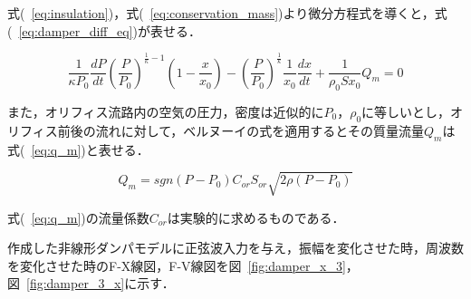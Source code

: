 \documentclass[a4paper,12pt]{article_vdlab_sotsuron}
\begin{document}
式(~\ref{eq:insulation})，式(~\ref{eq:conservation_mass})より微分方程式を導くと，式(~\ref{eq:damper_diff_eq})が表せる．

\begin{equation}
  \frac{1}{\kappa P_0} \frac{dP}{dt} \left(\frac{P}{P_0} \right)^{\frac{1}{\kappa} -1} \left(1 - \frac{x}{x_0} \right) - \left(\frac{P}{P_0} \right)^{\frac{1}{\kappa}} \frac{1}{x_0} \frac{dx}{dt} + \frac{1}{\rho_0 S x_0} Q_m = 0 \label{eq:damper_diff_eq}
\end{equation}

また，オリフィス流路内の空気の圧力，密度は近似的に$P_0$，$\rho_0$に等しいとし，オリフィス前後の流れに対して，ベルヌーイの式を適用するとその質量流量$Q_m$は式(~\ref{eq:q_m})と表せる．

\begin{equation}
  Q_m = sgn\left(P - P_0 \right)C_{or}S_{or}\sqrt{2 \rho \left(P-P_0 \right)} \label{eq:q_m}
\end{equation}

式(~\ref{eq:q_m})の流量係数$C_{or}$は実験的に求めるものである．

\newpage
作成した非線形ダンパモデルに正弦波入力を与え，振幅を変化させた時，周波数を変化させた時のF-X線図，F-V線図を図~\ref{fig:damper_x_3}，図~\ref{fig:damper_3_x}に示す．
\end{document}
